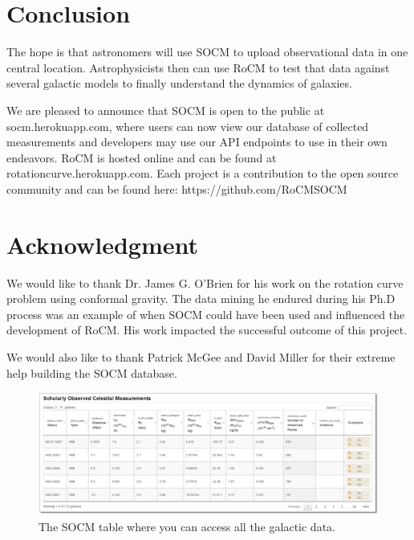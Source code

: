 \documentclass[conference]{IEEEtran}
\begin{document}
\section{Conclusion}
The hope is that astronomers will use SOCM to upload observational data in one central location. Astrophysicists then can use RoCM to test that data against several galactic models to finally understand the dynamics of galaxies. 

	 We are pleased to announce that SOCM is open to the public at socm.herokuapp.com, where users can now view our database of collected measurements and developers may use our API endpoints to use in their own endeavors. RoCM is hosted online and can be found at rotationcurve.herokuapp.com. Each project is a contribution to the open source community and can be found here: https://github.com/RoCMSOCM



\section*{Acknowledgment}

We would like to thank Dr. James G. O’Brien for his work on the rotation curve problem using conformal gravity. The data mining he endured during his Ph.D process was an example of when SOCM could have been used and influenced the development of RoCM. His work impacted the successful outcome of this project. 

We would also like to thank Patrick McGee and David Miller for their extreme help building the SOCM database.







\begin{figure}[!t]
\centering
\includegraphics[width=\textwidth]{socmtable}
\caption{The SOCM table where you can access all the galactic data.}
\label{socm_fig}
\end{figure}
\end{document}
